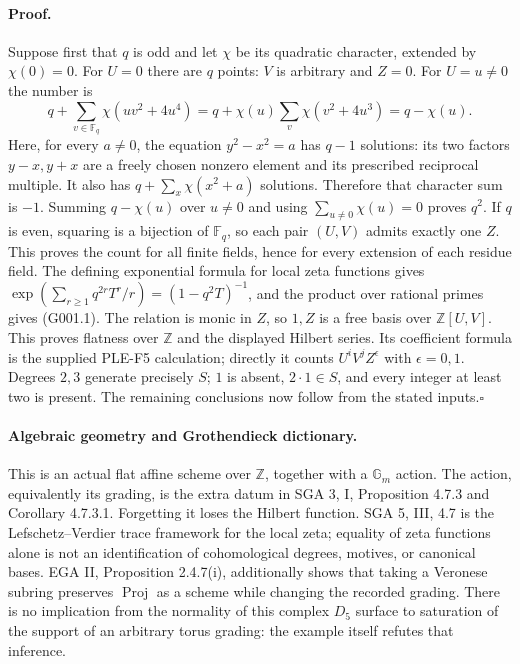 \paragraph{Proof.}
Suppose first that $q$ is odd and let $\chi$ be its quadratic character,
extended by $\chi(0)=0$. For $U=0$ there are $q$ points: $V$ is arbitrary
and $Z=0$. For $U=u\ne0$ the number is
\[
 q+\sum_{v\in\mathbb F_q}\chi(uv^2+4u^4)
 =q+\chi(u)\sum_v\chi(v^2+4u^3)=q-\chi(u).
\]
Here, for every $a\ne0$, the equation $y^2-x^2=a$ has $q-1$
solutions: its two factors $y-x,y+x$ are a freely chosen nonzero
element and its prescribed reciprocal multiple. It also has
$q+\sum_x\chi(x^2+a)$ solutions. Therefore that character sum is
$-1$. Summing $q-\chi(u)$ over $u\ne0$ and using
$\sum_{u\ne0}\chi(u)=0$ proves $q^2$.
If $q$ is even, squaring is a bijection of $\mathbb F_q$, so each
pair $(U,V)$ admits exactly one $Z$. This proves the count for all
finite fields, hence for every extension of each residue field.
The defining exponential formula for local zeta functions gives
$\exp(\sum_{r\ge1}q^{2r}T^r/r)=(1-q^2T)^{-1}$, and the product
over rational primes gives (G001.1).
The relation is monic in $Z$, so $1,Z$ is a free basis over
$\mathbb Z[U,V]$. This proves flatness over $\mathbb Z$ and the
displayed Hilbert series. Its coefficient formula is the supplied
PLE-F5 calculation; directly it counts $U^iV^jZ^\epsilon$ with
$\epsilon=0,1$. Degrees $2,3$ generate precisely $S$; $1$ is absent,
$2\cdot1\in S$, and every integer at least two is present. The
remaining conclusions now follow from the stated inputs.\hfill$\square$

\paragraph{Algebraic geometry and Grothendieck dictionary.}
This is an actual flat affine scheme over $\mathbb Z$, together with a
$\mathbb G_m$ action. The action, equivalently its grading, is the
extra datum in SGA 3, I, Proposition 4.7.3 and Corollary 4.7.3.1.
Forgetting it loses the Hilbert function. SGA 5, III, 4.7 is the
Lefschetz--Verdier trace framework for the local zeta; equality of
zeta functions alone is not an identification of cohomological
degrees, motives, or canonical bases. EGA II, Proposition 2.4.7(i),
additionally shows that taking a Veronese subring preserves
$\operatorname{Proj}$ as a scheme while changing the recorded grading.
There is no implication from the normality of this complex $D_5$
surface to saturation of the support of an arbitrary torus grading:
the example itself refutes that inference.

